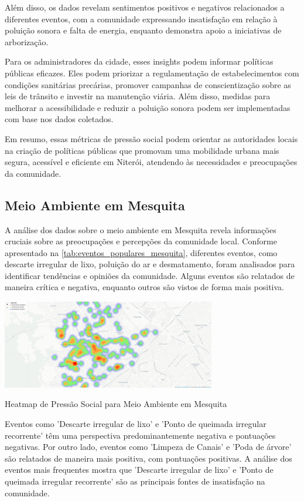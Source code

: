 Além disso, os dados revelam sentimentos positivos e negativos relacionados a diferentes eventos, com a comunidade expressando insatisfação em relação à poluição sonora e falta de energia, enquanto demonstra apoio a iniciativas de arborização.

Para os administradores da cidade, esses insights podem informar políticas públicas eficazes. Eles podem priorizar a regulamentação de estabelecimentos com condições sanitárias precárias, promover campanhas de conscientização sobre as leis de trânsito e investir na manutenção viária. Além disso, medidas para melhorar a acessibilidade e reduzir a poluição sonora podem ser implementadas com base nos dados coletados.

Em resumo, essas métricas de pressão social podem orientar as autoridades locais na criação de políticas públicas que promovam uma mobilidade urbana mais segura, acessível e eficiente em Niterói, atendendo às necessidades e preocupações da comunidade.

\subsection{Meio Ambiente em Mesquita}
A análise dos dados sobre o meio ambiente em Mesquita revela informações cruciais sobre as preocupações e percepções da comunidade local. Conforme apresentado na \autoref{tab:eventos_populares_mesquita}, diferentes eventos, como descarte irregular de lixo, poluição do ar e desmatamento, foram analisados para identificar tendências e opiniões da comunidade. Alguns eventos são relatados de maneira crítica e negativa, enquanto outros são vistos de forma mais positiva.

\begin{quadro}[htb]
	\centering
	\includegraphics[width=0.7\textwidth]{images/heatmap_mesquita.PNG}
	\caption{Heatmap de Pressão Social para Meio Ambiente em Mesquita}
	\label{fig:heatmap_mesquita}
\end{quadro}

Eventos como 'Descarte irregular de lixo' e 'Ponto de queimada irregular recorrente' têm uma perspectiva predominantemente negativa e pontuações negativas. Por outro lado, eventos como 'Limpeza de Canais' e 'Poda de árvore' são relatados de maneira mais positiva, com pontuações positivas. A análise dos eventos mais frequentes mostra que 'Descarte irregular de lixo' e 'Ponto de queimada irregular recorrente' são as principais fontes de insatisfação na comunidade.

